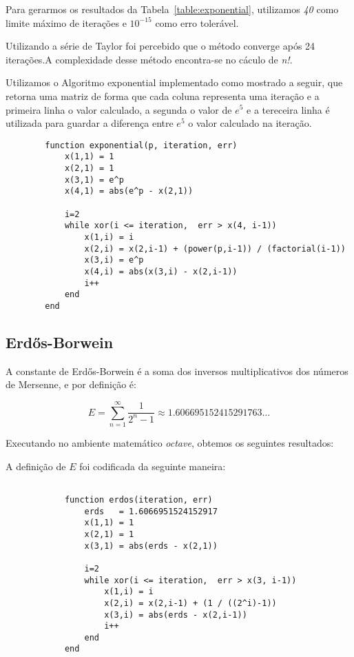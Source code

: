 		Para gerarmos os resultados da Tabela~\ref{table:exponential},
		utilizamos \emph{40} como limite máximo de iterações e $10^{-15}$ como erro
		tolerável.

		

		Utilizando a série de Taylor foi percebido que o método converge após 24
		iterações.A complexidade desse método encontra-se no cáculo de
		\emph{n!}.

		Utilizamos o Algoritmo exponential implementado como mostrado a seguir,
		que retorna uma matriz de forma que cada coluna representa uma iteração
		e a primeira linha o valor calculado, a segunda o valor de $e^5$ e a
		tereceira linha é utilizada para guardar a diferença entre $e^5$ o valor
		calculado na iteração.

		\newpage

		\begin{lstlisting}
		function exponential(p, iteration, err)
			x(1,1) = 1
			x(2,1) = 1
			x(3,1) = e^p
			x(4,1) = abs(e^p - x(2,1))

			i=2
			while xor(i <= iteration,  err > x(4, i-1))
				x(1,i) = i
				x(2,i) = x(2,i-1) + (power(p,i-1)) / (factorial(i-1))
				x(3,i) = e^p
				x(4,i) = abs(x(3,i) - x(2,i-1))
				i++
			end
		end
		\end{lstlisting}

	\subsection{Erdős-Borwein}

		A constante de Erdős-Borwein é a soma dos inversos multiplicativos dos
		números de Mersenne, e por definição é:

		\begin{equation}
			E = \displaystyle\sum_{n=1}^{\infty} \frac{1}{2^n-1} \approx 1.606695152415291763\dots
		\end{equation}

		Executando no ambiente matemático \emph{octave}, obtemos os seguintes
		resultados:

		

		A definição de $E$ foi codificada da seguinte maneira:

		\begin{lstlisting}

			function erdos(iteration, err)
				erds   = 1.6066951524152917
				x(1,1) = 1
				x(2,1) = 1
				x(3,1) = abs(erds - x(2,1))

				i=2
				while xor(i <= iteration,  err > x(3, i-1))
					x(1,i) = i
					x(2,i) = x(2,i-1) + (1 / ((2^i)-1))
					x(3,i) = abs(erds - x(2,i-1))
					i++
				end
			end

		\end{lstlisting}
